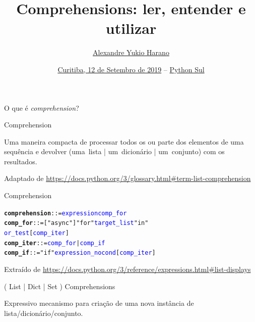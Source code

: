 \documentclass[11pt]{beamer}
\title{\normalsize{Comprehensions: ler, entender e utilizar}}
\author{\href{https://alexandre.harano.net.br/}{Alexandre Yukio Harano}}
\institute[.]
{alexandre@harano.net.br\\
 \url{https://alexandre.harano.net.br/}}
\date{\scriptsize{\href{https://pythonsul.org/}{Curitiba, 12 de Setembro de 2019}
 --
\href{https://pythonsul.org/}{Python Sul}}}
\begin{document}
\maketitle

\begin{frame}[standout]
  O que é \textit{comprehension}?
\end{frame}

\begin{frame}[fragile]{Comprehension}
  \begin{flushright}
  \begin{minipage}{\linewidth}\begin{flushleft}
  Uma maneira compacta de processar todos os ou parte dos elementos de uma sequência e devolver (uma~lista | um~dicionário | um~conjunto) com os resultados.
  \end{flushleft}
  \end{minipage}

  \tiny{\vspace*{.25cm}
    Adaptado de \url{https://docs.python.org/3/glossary.html#term-list-comprehension}}
  \end{flushright}
\end{frame}

\begin{frame}[fragile]{Comprehension}
  \begin{flushright}
  \begin{alltt}\small
\textbf{comprehension} ::=  \textcolor{blue}{expression} \textcolor{blue}{comp_for}
\textbf{comp_for}      ::=  ["async"] "for" \textcolor{blue}{target_list} "in"
                   \textcolor{blue}{or_test} [\textcolor{blue}{comp_iter}]
\textbf{comp_iter}     ::=  \textcolor{blue}{comp_for} | \textcolor{blue}{comp_if}
\textbf{comp_if}       ::=  "if" \textcolor{blue}{expression_nocond} [\textcolor{blue}{comp_iter}]
\end{alltt}

  \tiny{\vspace*{.25cm}
    Extraído de \url{https://docs.python.org/3/reference/expressions.html#list-displays}}
  \end{flushright}
\end{frame}

\begin{frame}[fragile]{( List | Dict | Set ) Comprehensions}
  \begin{overprint}
  Expressivo mecanismo para criação de uma nova instância de lista/dicionário/conjunto.\only<2->{.}
  \end{overprint}
\end{frame}
\end{document}
